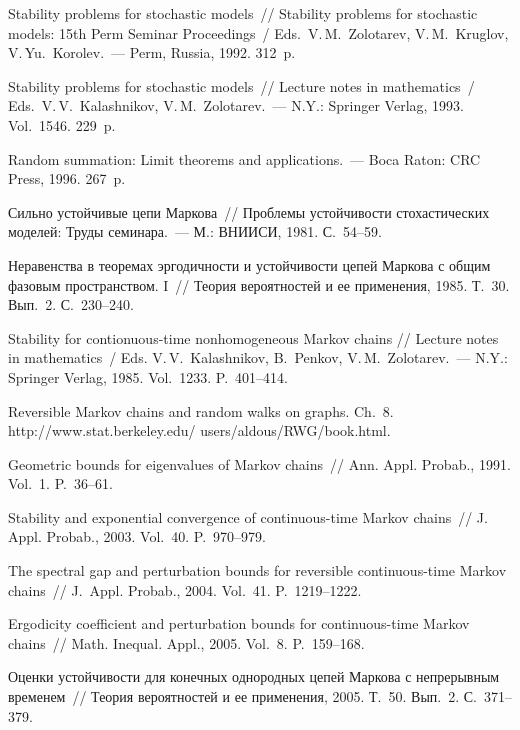 \begin{multicols}{2}
{{\begin{thebibliography}{99}
Stability problems for stochastic models~// Stability problems for stochastic models:
15th Perm Seminar Proceedings~/ Eds.\ V.\,M.~Zolotarev, V.\,M.~Kruglov,
V.\,Yu.~Korolev.~--- Perm, Russia, 1992. 312~p.

Stability problems for stochastic models~// Lecture notes in mathematics~/
Eds.\ V.\,V.~Kalashnikov, V.\,M.~Zolotarev.~--- N.Y.: Springer Verlag, 1993. Vol.~1546. 229~p.



Random summation: Limit theorems and applications.~--- Boca Raton: CRC Press, 1996. 267~p.

 Сильно устойчивые цепи Маркова~// Проб\-ле\-мы
устой\-чи\-вости сто\-ха\-сти\-че\-ских моделей: Труды семинара.~---
М.: ВНИИСИ, 1981. С.~54--59.

 Неравенства в теоремах эргодич\-ности и устойчивости цепей
Маркова с общим фазовым пространством. I~// Теория вероятностей и ее применения, 1985.
Т.~30. Вып.~2. С.~230--240.

  Stability for contionuous-time nonhomogeneous 
Markov chains //  Lecture notes in
mathematics~/ Eds. V.\,V.~Kalashnikov, B.~Penkov, V.\,M.~Zolotarev.~---
N.Y.: Springer Verlag,  1985. Vol.~1233. P.~401--414.

 Reversible Markov chains and random walks on graphs.
Ch.~8. {\sf http://www.stat.berkeley.edu/ users/aldous/RWG/book.html}. 

 Geometric bounds for eigenvalues of Markov chains~//
Ann. Appl. Probab., 1991. Vol.~1. P.~36--61.

  Stability and exponential convergence of continuous-time
Markov chains~// J. Appl. Probab., 2003. Vol.~40. P.~970--979.

  The spectral gap and perturbation
bounds for reversible continuous-time Markov chains~// J.~Appl.
Probab., 2004. Vol.~41. P.~1219--1222.

 Ergodicity coefficient and perturbation bounds for
continuous-time Markov chains~// Math. Inequal. Appl., 2005. Vol.~8. P.~159--168.

 Оценки устойчивости для конечных однородных цепей
Маркова с непрерывным временем~// Теория вероятностей и ее применения, 2005. Т.~50.
Вып.~2. С.~371--379.


\end{thebibliography}}}
\end{multicols}
